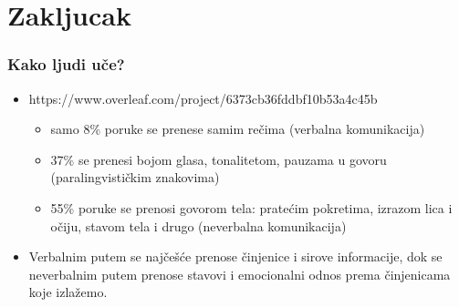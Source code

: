 \documentclass{beamer}
\begin{document}
\section{Zakljucak}

\begin{frame}[fragile]\frametitle{Kako ljudi uče?}
	\begin{itemize}	
		\item https://www.overleaf.com/project/6373cb36fddbf10b53a4c45b
		\begin{itemize}
			\item samo 8\% poruke se prenese samim rečima (verbalna komunikacija)
			\item 37\% se prenesi bojom glasa, tonalitetom, pauzama u govoru (paralingvističkim znakovima)
			\item 55\% poruke se prenosi govorom tela: pratećim pokretima, izrazom lica i
			očiju, stavom tela i drugo (neverbalna komunikacija)
		\end{itemize}
		\item Verbalnim putem se najčešće prenose činjenice i
		sirove informacije, dok se neverbalnim putem prenose stavovi i
		emocionalni odnos prema činjenicama koje izlažemo.
	\end{itemize}
\end{frame}
\end{document}
